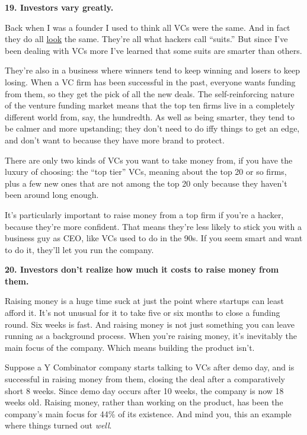 \documentclass[12pt]{book}
\begin{document}
\textbf{19. Investors vary greatly.}

Back when I was a founder I used to think all VCs were the same. And in
fact they do all \href{http://www.redpoint.com/team/}{look} the same.
They're all what hackers call ``suits.'' But since I've been dealing
with VCs more I've learned that some suits are smarter than others.

They're also in a business where winners tend to keep winning and losers
to keep losing. When a VC firm has been successful in the past, everyone
wants funding from them, so they get the pick of all the new deals. The
self-reinforcing nature of the venture funding market means that the top
ten firms live in a completely different world from, say, the hundredth.
As well as being smarter, they tend to be calmer and more upstanding;
they don't need to do iffy things to get an edge, and don't want to
because they have more brand to protect.

There are only two kinds of VCs you want to take money from, if you have
the luxury of choosing: the ``top tier'' VCs, meaning about the top 20
or so firms, plus a few new ones that are not among the top 20 only
because they haven't been around long enough.

It's particularly important to raise money from a top firm if you're a
hacker, because they're more confident. That means they're less likely
to stick you with a business guy as CEO, like VCs used to do in the 90s.
If you seem smart and want to do it, they'll let you run the company.

\textbf{20. Investors don't realize how much it costs to raise money
from them.}

Raising money is a huge time suck at just the point where startups can
least afford it. It's not unusual for it to take five or six months to
close a funding round. Six weeks is fast. And raising money is not just
something you can leave running as a background process. When you're
raising money, it's inevitably the main focus of the company. Which
means building the product isn't.

Suppose a Y Combinator company starts talking to VCs after demo day, and
is successful in raising money from them, closing the deal after a
comparatively short 8 weeks. Since demo day occurs after 10 weeks, the
company is now 18 weeks old. Raising money, rather than working on the
product, has been the company's main focus for 44\% of its existence.
And mind you, this an example where things turned out \emph{well}.
\end{document}
